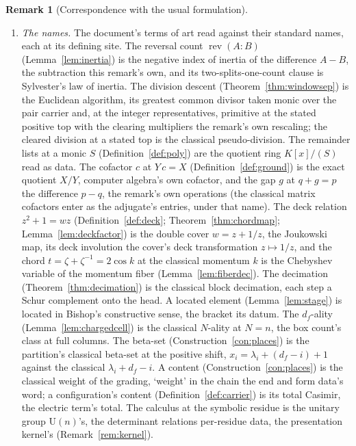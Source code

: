\documentclass[11pt]{article}
\theoremstyle{definition}
\newtheorem{remark}{Remark}
\begin{document}
\begin{remark}[Correspondence with the usual formulation]
\begin{enumerate}[leftmargin=2em,itemsep=3pt]
\item \emph{The names.} The document's terms of art read against
their standard names, each at its defining site. The reversal
count $\operatorname{rev}(A\!:\!B)$ (Lemma~\ref{lem:inertia}) is
the negative index of inertia of the difference $A-B$, the
subtraction this remark's own, and its two-splits-one-count
clause is Sylvester's law of inertia. The division descent
(Theorem~\ref{thm:windowsep}) is the Euclidean algorithm, its
greatest common divisor taken monic over the pair carrier and, at
the integer representatives, primitive at the stated positive top
with the clearing multipliers the remark's own rescaling; the
cleared division at a stated top is the classical
pseudo-division. The
remainder lists at a monic $S$ (Definition~\ref{def:poly}) are the
quotient ring $K[x]/(S)$ read as data. The cofactor $c$ at
$Y\,c=X$ (Definition~\ref{def:ground}) is the exact quotient $X/Y$,
computer algebra's own cofactor, and
the gap $g$ at $q+g=p$ the difference $p-q$, the remark's own
operations (the classical matrix cofactors enter as the
adjugate's entries, under that name). The deck relation $z^2+1=wz$
(Definition~\ref{def:deck}; Theorem~\ref{thm:chordmap};
Lemma~\ref{lem:deckfactor}) is the
double cover $w=z+1/z$, the Joukowski map, its deck involution
the cover's deck transformation $z\mapsto1/z$, and the chord
$t=\zeta+\zeta^{-1}=2\cos k$ at the classical momentum $k$ is the
Chebyshev variable of the momentum fiber
(Lemma~\ref{lem:fiberdec}). The decimation
(Theorem~\ref{thm:decimation}) is the classical block decimation,
each step a Schur complement onto the head. A located
element (Lemma~\ref{lem:stage}) is located in Bishop's
constructive sense, the bracket its datum. The $d_f$-ality
(Lemma~\ref{lem:chargedcell}) is the classical $N$-ality at
$N=n$, the box count's class at full columns. The beta-set
(Construction~\ref{con:places}) is the partition's classical
beta-set at the positive shift, $x_i=\lambda_i+(d_f-i)+1$ against
the classical $\lambda_i+d_f-i$. A content (Construction~\ref{con:places}) is the
classical weight of the grading, `weight' in the chain the end and
form data's word; a configuration's content
(Definition~\ref{def:carrier}) is its total Casimir, the electric
term's total. The calculus at the symbolic residue is the
unitary group $\mathrm{U}(n)$'s, the determinant relations
per-residue data, the presentation kernel's
(Remark~\ref{rem:kernel}).


\end{enumerate}
\end{remark}
\end{document}

